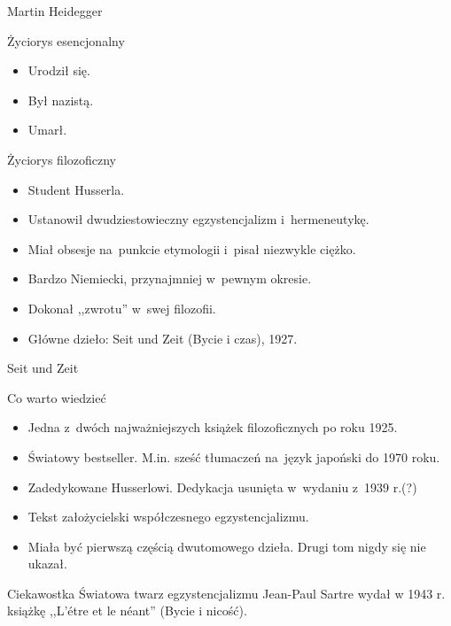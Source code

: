 \begin{frame}{Martin Heidegger}
\begin{block}{Życiorys esencjonalny}
\begin{itemize}
\pause
\item Urodził się.
\pause
\item Był nazistą.
\pause
\item Umarł.
\end{itemize}
\end{block}
\pause

\begin{block}{Życiorys filozoficzny}
\begin{itemize}
\item Student Husserla.
\item Ustanowił dwudziestowieczny egzystencjalizm i~hermeneutykę.
\item Miał obsesje na~punkcie etymologii i~pisał niezwykle ciężko.
\item Bardzo Niemiecki, przynajmniej w~pewnym okresie.
\item Dokonał ,,zwrotu'' w~swej filozofii.
\item Główne dzieło:\newline
Seit und Zeit (Bycie i czas), 1927.
\end{itemize}
\end{block}
\end{frame}

\begin{frame}{Seit und Zeit}
\begin{block}{Co warto wiedzieć}
\begin{itemize}
\item Jedna z~dwóch najważniejszych książek filozoficznych po roku 1925.
\item Światowy bestseller. M.in. sześć tłumaczeń na~język japoński do 1970 roku.
\item Zadedykowane Husserlowi. Dedykacja usunięta w~wydaniu z~1939 r.(?)
\item Tekst założycielski współczesnego egzystencjalizmu.
\item Miała być pierwszą częścią dwutomowego dzieła. Drugi tom nigdy się nie ukazał.
\end{itemize}
\end{block}

\begin{block}{Ciekawostka}
Światowa twarz egzystencjalizmu Jean-Paul Sartre wydał w 1943 r. książkę ,,L'étre et le néant'' (Bycie i nicość).
\end{block}
\end{frame}

